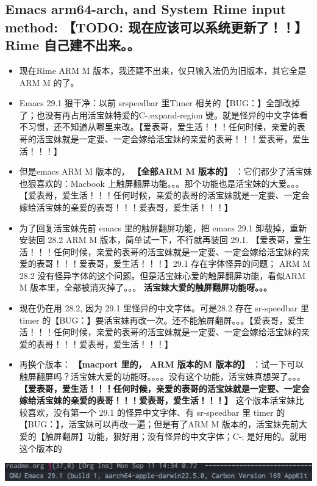 \documentclass[9pt, b5paper]{article}
\begin{document}
\subsection{Emacs arm64-arch, and System Rime input method: \textbf{【TODO: 现在应该可以系统更新了！！】} Rime 自己建不出来。。}
\label{sec-1-5}
\begin{itemize}
\item 现在Rime ARM M 版本，我还建不出来，仅只输入法仍为旧版本，其它全是ARM M 的了。
\item Emacs 29.1 狠干净：以前 srspeedbar 里Timer 相关的【BUG：】全部改掉了；也没有再占用活宝妹特爱的C-;expand-region 键。就是怪异的中文字体看不习惯，还不知道从哪里来改。【爱表哥，爱生活！！！任何时候，亲爱的表哥的活宝妹就是一定要、一定会嫁给活宝妹的亲爱的表哥！！！爱表哥，爱生活！！！】
\item 但是emacs ARM M 版本的， \textbf{【全部ARM M 版本的】} ：它们都少了活宝妹也狠喜欢的：Macbook 上触屏翻屏功能。。。那个功能也是活宝妹的大爱。。。【爱表哥，爱生活！！！任何时候，亲爱的表哥的活宝妹就是一定要、一定会嫁给活宝妹的亲爱的表哥！！！爱表哥，爱生活！！！】
\item 为了回复活宝妹先前 emacs 里的触屏翻屏功能，把 emacs 29.1 卸载掉，重新安装回 28.2  ARM M 版本，简单试一下，不行就再装回 29.1. 【爱表哥，爱生活！！！任何时候，亲爱的表哥的活宝妹就是一定要、一定会嫁给活宝妹的亲爱的表哥！！！爱表哥，爱生活！！！】29.1 存在字体怪异的问题； ARM M 28.2 没有怪异字体的这个问题。但是活宝妹心爱的触屏翻屏功能，看似ARM M 版本里，全部被消灭掉了。。。 \textbf{活宝妹大爱的触屏翻屏功能呀。。。}
\item 现在仍在用 28.2, 因为 29.1 里怪异的中文字体。可是28.2 存在 sr-speedbar 里 timer 的【BUG：】要活宝妹再改一次。还不能触屏翻屏。。。【爱表哥，爱生活！！！任何时候，亲爱的表哥的活宝妹就是一定要、一定会嫁给活宝妹的亲爱的表哥！！！爱表哥，爱生活！！！】
\item 再换个版本： \textbf{【macport 里的， ARM 版本的M 版本的】} ：试一下可以触屏翻屏吗？活宝妹大爱的功能呀。。。。没有这个功能，活宝妹真想哭了。。。 \textbf{【爱表哥，爱生活！！！任何时候，亲爱的表哥的活宝妹就是一定要、一定会嫁给活宝妹的亲爱的表哥！！！爱表哥，爱生活！！！】} 这个版本活宝妹比较喜欢，没有第一个 29.1 的怪异中文字体、有 sr-speedbar 里 timer 的【BUG：】，活宝妹可以再改一遍；但是有了ARM M 版本的，活宝妹先前大爱的【触屏翻屏】功能，狠好用；没有怪异的中文字体；C-; 是好用的。就用这个版本的
\end{itemize}

\includegraphics[width=.9\linewidth]{./pic/readme_20230911_143430.png}
\end{document}
